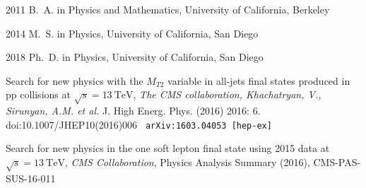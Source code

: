 \begin{frontmatter}
\begin{vitapage}                                                               
\begin{vita}                                                                   
  \item[2011] B.~A. in Physics and Mathematics, University of California, Berkeley                                                    
  \item[2014] M.~S. in Physics, University of California, San Diego                                                    
  \item[2018] Ph.~D. in Physics, University of California, San Diego    
\end{vita}                                                                     
\begin{publications}                                                           
\item Search for new physics with the $M_{T2}$ variable in all-jets
  final states produced in pp collisions at
  $\sqrt{s}=13~\mathrm{TeV}$, {\it The CMS collaboration,
  Khachatryan, V., Sirunyan, A.M. et al.} J. High Energ. Phys. (2016)
2016: 6. doi:10.1007/JHEP10(2016)006 {\tt
  arXiv:1603.04053 [hep-ex]}
\item Search for new physics in the one soft lepton final state using
  2015 data at $\sqrt{s}=13~\mathrm{TeV}$, {\it CMS Collaboration},
Physics Analysis Summary (2016), CMS-PAS-SUS-16-011
\item {}


\end{publications}
\end{vitapage}
\end{frontmatter}
